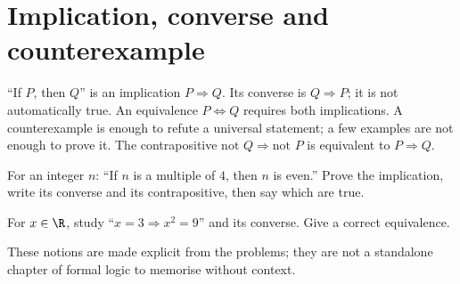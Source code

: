 \section{Implication, converse and counterexample}
\begin{keypoint}
``If $P$, then $Q$'' is an implication $P\Rightarrow Q$. Its converse is $Q\Rightarrow P$; it is not automatically true. An equivalence $P\iff Q$ requires both implications.
A counterexample is enough to refute a universal statement; a few examples are not enough to prove it. The contrapositive $\text{not }Q\Rightarrow\text{not }P$ is equivalent to $P\Rightarrow Q$.
\end{keypoint}
\begin{example}For an integer $n$: ``If $n$ is a multiple of $4$, then $n$ is even.'' Prove the implication, write its converse and its contrapositive, then say which are true.\end{example}
\begin{example}For $x\in\R$, study ``$x=3\Rightarrow x^2=9$'' and its converse. Give a correct equivalence.\end{example}
\begin{teachernote}These notions are made explicit from the problems; they are not a standalone chapter of formal logic to memorise without context.\end{teachernote}

